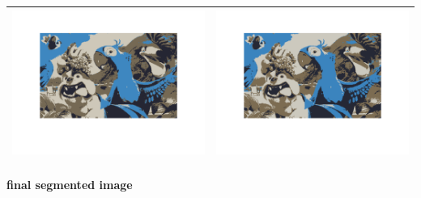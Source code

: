 \documentclass[fleqn]{article}
\newcommand{\myparagraph}[1]{\paragraph{#1}\mbox{}\\}
\begin{document}
\begin{center}
\begin{longtable}{ c | c }
	\includegraphics[scale=0.4]{./pics/task1and2/rio_k=4_random/K=4_iteration_9_random_4_rio.png} & \includegraphics[scale=0.4]{./pics/task1and2/rio_k=4_random/K=4_iteration_10_random_4_rio.png} \\\hline
  \end{longtable}	
\end{center}

\myparagraph{final segmented image}
\end{document}
